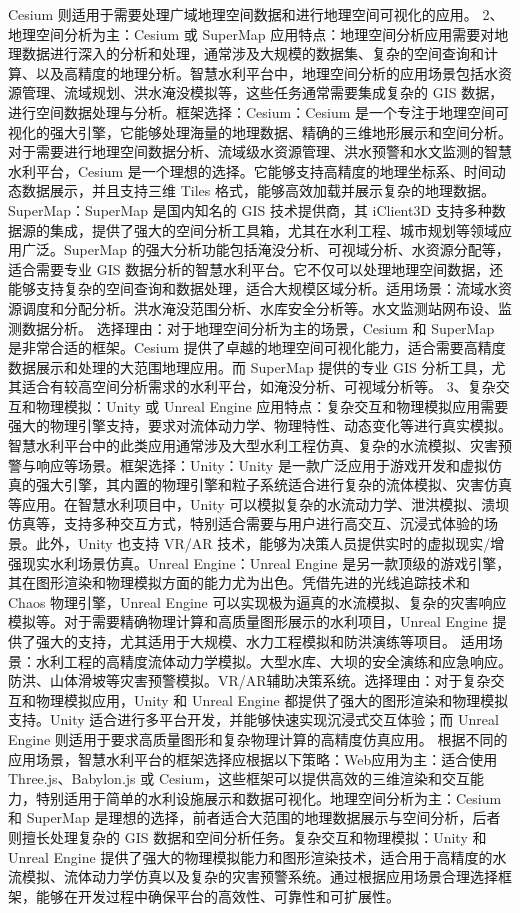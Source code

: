 {{{Cesium 则适用于需要处理广域地理空间数据和进行地理空间可视化的应用。 2、地理空间分析为主：Cesium 或 SuperMap 应用特点：地理空间分析应用需要对地理数据进行深入的分析和处理，通常涉及大规模的数据集、复杂的空间查询和计算、以及高精度的地理分析。智慧水利平台中，地理空间分析的应用场景包括水资源管理、流域规划、洪水淹没模拟等，这些任务通常需要集成复杂的 GIS 数据，进行空间数据处理与分析。框架选择：Cesium：Cesium 是一个专注于地理空间可视化的强大引擎，它能够处理海量的地理数据、精确的三维地形展示和空间分析。对于需要进行地理空间数据分析、流域级水资源管理、洪水预警和水文监测的智慧水利平台，Cesium 是一个理想的选择。它能够支持高精度的地理坐标系、时间动态数据展示，并且支持三维 Tiles 格式，能够高效加载并展示复杂的地理数据。SuperMap：SuperMap 是国内知名的 GIS 技术提供商，其 iClient3D 支持多种数据源的集成，提供了强大的空间分析工具箱，尤其在水利工程、城市规划等领域应用广泛。SuperMap 的强大分析功能包括淹没分析、可视域分析、水资源分配等，适合需要专业 GIS 数据分析的智慧水利平台。它不仅可以处理地理空间数据，还能够支持复杂的空间查询和数据处理，适合大规模区域分析。适用场景：流域水资源调度和分配分析。洪水淹没范围分析、水库安全分析等。水文监测站网布设、监测数据分析。 选择理由：对于地理空间分析为主的场景，Cesium 和 SuperMap 是非常合适的框架。Cesium 提供了卓越的地理空间可视化能力，适合需要高精度数据展示和处理的大范围地理应用。而 SuperMap 提供的专业 GIS 分析工具，尤其适合有较高空间分析需求的水利平台，如淹没分析、可视域分析等。 3、复杂交互和物理模拟：Unity 或 Unreal Engine 应用特点：复杂交互和物理模拟应用需要强大的物理引擎支持，要求对流体动力学、物理特性、动态变化等进行真实模拟。智慧水利平台中的此类应用通常涉及大型水利工程仿真、复杂的水流模拟、灾害预警与响应等场景。框架选择：Unity：Unity 是一款广泛应用于游戏开发和虚拟仿真的强大引擎，其内置的物理引擎和粒子系统适合进行复杂的流体模拟、灾害仿真等应用。在智慧水利项目中，Unity 可以模拟复杂的水流动力学、泄洪模拟、溃坝仿真等，支持多种交互方式，特别适合需要与用户进行高交互、沉浸式体验的场景。此外，Unity 也支持 VR/AR 技术，能够为决策人员提供实时的虚拟现实/增强现实水利场景仿真。Unreal Engine：Unreal Engine 是另一款顶级的游戏引擎，其在图形渲染和物理模拟方面的能力尤为出色。凭借先进的光线追踪技术和 Chaos 物理引擎，Unreal Engine 可以实现极为逼真的水流模拟、复杂的灾害响应模拟等。对于需要精确物理计算和高质量图形展示的水利项目，Unreal Engine 提供了强大的支持，尤其适用于大规模、水力工程模拟和防洪演练等项目。 适用场景：水利工程的高精度流体动力学模拟。大型水库、大坝的安全演练和应急响应。防洪、山体滑坡等灾害预警模拟。VR/AR辅助决策系统。选择理由：对于复杂交互和物理模拟应用，Unity 和 Unreal Engine 都提供了强大的图形渲染和物理模拟支持。Unity 适合进行多平台开发，并能够快速实现沉浸式交互体验；而 Unreal Engine 则适用于要求高质量图形和复杂物理计算的高精度仿真应用。 根据不同的应用场景，智慧水利平台的框架选择应根据以下策略：Web应用为主：适合使用 Three.js、Babylon.js 或 Cesium，这些框架可以提供高效的三维渲染和交互能力，特别适用于简单的水利设施展示和数据可视化。地理空间分析为主：Cesium 和 SuperMap 是理想的选择，前者适合大范围的地理数据展示与空间分析，后者则擅长处理复杂的 GIS 数据和空间分析任务。复杂交互和物理模拟：Unity 和 Unreal Engine 提供了强大的物理模拟能力和图形渲染技术，适合用于高精度的水流模拟、流体动力学仿真以及复杂的灾害预警系统。通过根据应用场景合理选择框架，能够在开发过程中确保平台的高效性、可靠性和可扩展性。 }}}
